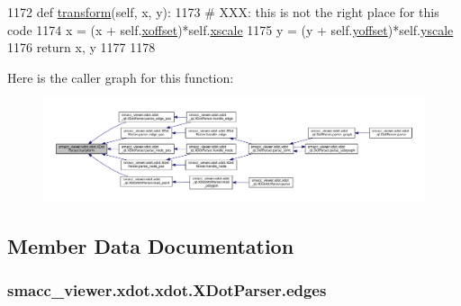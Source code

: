 \begin{DoxyCode}
1172     \textcolor{keyword}{def }\hyperlink{classsmacc__viewer_1_1xdot_1_1xdot_1_1XDotParser_a490b6dcfb3944af0d6d691f1aa25db54}{transform}(self, x, y):
1173         \textcolor{comment}{# XXX: this is not the right place for this code}
1174         x = (x + self.\hyperlink{classsmacc__viewer_1_1xdot_1_1xdot_1_1XDotParser_a62eaf1edc60a3fc0fa9de0ea6e4e48ae}{xoffset})*self.\hyperlink{classsmacc__viewer_1_1xdot_1_1xdot_1_1XDotParser_a3c3b5417bb8d937745bc0160d568915f}{xscale}
1175         y = (y + self.\hyperlink{classsmacc__viewer_1_1xdot_1_1xdot_1_1XDotParser_ac9489fc14a7ba7229f965c327b479385}{yoffset})*self.\hyperlink{classsmacc__viewer_1_1xdot_1_1xdot_1_1XDotParser_a89fee1a8bb775af0509be2bce06b6e34}{yscale}
1176         \textcolor{keywordflow}{return} x, y
1177 
1178 
\end{DoxyCode}


Here is the caller graph for this function\+:
\nopagebreak
\begin{figure}[H]
\begin{center}
\leavevmode
\includegraphics[width=350pt]{classsmacc__viewer_1_1xdot_1_1xdot_1_1XDotParser_a490b6dcfb3944af0d6d691f1aa25db54_icgraph}
\end{center}
\end{figure}




\subsection{Member Data Documentation}
\subsubsection[{\texorpdfstring{edges}{edges}}]{\setlength{\rightskip}{0pt plus 5cm}smacc\+\_\+viewer.\+xdot.\+xdot.\+X\+Dot\+Parser.\+edges}\hypertarget{classsmacc__viewer_1_1xdot_1_1xdot_1_1XDotParser_a7c816c08835a7559802b2df9d60a19bc}{}\label{classsmacc__viewer_1_1xdot_1_1xdot_1_1XDotParser_a7c816c08835a7559802b2df9d60a19bc}


